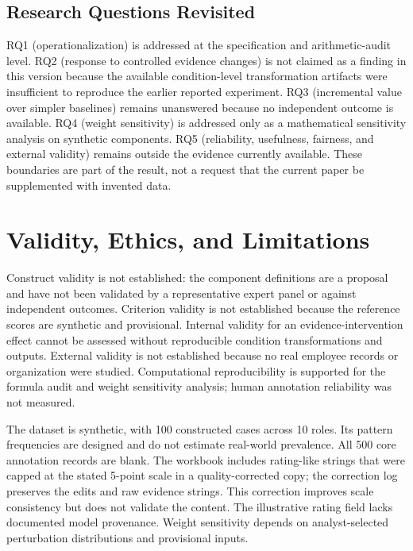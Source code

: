 \documentclass[
  10pt,
  a4paper,
  runningheads]{llncs}
\begin{document}
\subsection{Research Questions
Revisited}\label{research-questions-revisited}

RQ1 (operationalization) is addressed at the specification and
arithmetic-audit level. RQ2 (response to controlled evidence changes) is
not claimed as a finding in this version because the available
condition-level transformation artifacts were insufficient to reproduce
the earlier reported experiment. RQ3 (incremental value over simpler
baselines) remains unanswered because no independent outcome is
available. RQ4 (weight sensitivity) is addressed only as a mathematical
sensitivity analysis on synthetic components. RQ5 (reliability,
usefulness, fairness, and external validity) remains outside the
evidence currently available. These boundaries are part of the result,
not a request that the current paper be supplemented with invented data.

\section{Validity, Ethics, and
Limitations}\label{validity-ethics-and-limitations}

Construct validity is not established: the component definitions are a
proposal and have not been validated by a representative expert panel or
against independent outcomes. Criterion validity is not established
because the reference scores are synthetic and provisional. Internal
validity for an evidence-intervention effect cannot be assessed without
reproducible condition transformations and outputs. External validity is
not established because no real employee records or organization were
studied. Computational reproducibility is supported for the formula
audit and weight sensitivity analysis; human annotation reliability was
not measured.

The dataset is synthetic, with 100 constructed cases across 10 roles.
Its pattern frequencies are designed and do not estimate real-world
prevalence. All 500 core annotation records are blank. The workbook
includes rating-like strings that were capped at the stated 5-point
scale in a quality-corrected copy; the correction log preserves the
edits and raw evidence strings. This correction improves scale
consistency but does not validate the content. The illustrative rating
field lacks documented model provenance. Weight sensitivity depends on
analyst-selected perturbation distributions and provisional inputs.
\end{document}
